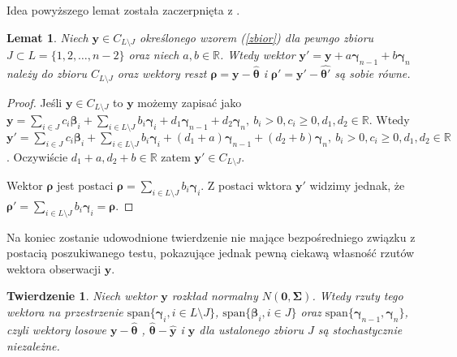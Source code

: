 \documentclass[12pt]{mwart}
\newtheorem{tw}{Twierdzenie}
\newtheorem{lm}{Lemat}
\begin{document}
Idea powyższego lemat została zaczerpnięta z \cite{meyer}.
\begin{lm}\label{suma}
Niech $\pmb{y}\in C_{L\setminus J}$ określonego wzorem (\ref{zbior}) dla pewngo zbioru $J\subset L=\{1,2,\dots,n-2\}$ oraz niech $a,b\in \mathbb{R}$. Wtedy wektor $\pmb{y}'=\pmb{y}+a\pmb{\gamma}_{n-1}+b\pmb{\gamma}_n$ należy do zbioru $C_{L\setminus J}$ oraz wektory reszt $\pmb{\rho}=\pmb{y}-\hat{\pmb{\theta}}$ i $\pmb{\rho}'=\pmb{y}'-\hat{\pmb{\theta}'}$ są sobie równe.
\end{lm}
\begin{proof}
Jeśli $\pmb{y}\in C_{L\setminus J}$ to $\pmb{y}$ możemy zapisać jako $\pmb{y}=\sum_{i\in J}{c_i\pmb{\beta}_i}+\sum_{i\in L\setminus J}{b_i\pmb{\gamma}_i}+d_1\pmb{\gamma}_{n-1}+d_2\pmb{\gamma}_n,\ b_i>0, c_i\geq 0, d_1,d_2\in \mathbb{R}$. Wtedy $\pmb{y}'=\sum_{i\in J}{c_i\pmb{\beta}_i}+\sum_{i\in L\setminus J}{b_i\pmb{\gamma}_i}+(d_1+a)\pmb{\gamma}_{n-1}+(d_2+b)\pmb{\gamma}_n,\ b_i>0, c_i\geq 0, d_1,d_2\in \mathbb{R}$. Oczywiście $d_1+a,d_2+b\in \mathbb{R}$ zatem $\pmb{y}'\in C_{L\setminus J}$.

Wektor $\pmb{\rho}$ jest postaci $\pmb{\rho}=\sum_{i\in L\setminus J}{b_i\pmb{\gamma}_i}$. Z postaci wktora $\pmb{y}'$ widzimy jednak, że $\pmb{\rho}'=\sum_{i\in L\setminus J}{b_i\pmb{\gamma}_i}=\pmb{\rho}$.
\end{proof}
Na koniec zostanie udowodnione twierdzenie nie mające bezpośredniego związku z postacią poszukiwanego testu, pokazujące jednak pewną ciekawą własność rzutów wektora obserwacji $\pmb{y}$.
\begin{tw}\label{niezaleznosc}
Niech wektor $\pmb{y}$ rozkład normalny $N(\pmb{0},\pmb{\Sigma})$. Wtedy rzuty tego wektora na przestrzenie $\textrm{span}\{\pmb{\gamma}_i,i\in L\setminus J\}$, $\textrm{span}\{\pmb{\beta}_i,i\in J\}$ oraz $\textrm{span}\{\pmb{\gamma}_{n-1},\pmb{\gamma}_n\}$, czyli wektory losowe $\pmb{y}-\hat{\pmb{\theta}}$ , $\hat{\pmb{\theta}}-\hat{\pmb{y}}$ i $\hat{\pmb{y}}$ dla ustalonego zbioru $J$ są stochastycznie niezależne.
\end{tw}
\end{document}

